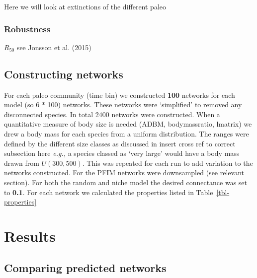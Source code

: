 \documentclass[
]{article}
\begin{document}
Here we will look at extinctions of the different paleo

\subsubsection{Robustness}\label{robustness}

\(R_{50}\) see Jonsson et al. (2015)

\subsection{Constructing networks}\label{constructing-networks}

For each paleo community (time bin) we constructed \textbf{100} networks
for each model (so 6 * 100) networks. These networks were `simplified'
to removed any disconnected species. In total 2400 networks were
constructed. When a quantitative measure of body size is needed (ADBM,
bodymassratio, lmatrix) we drew a body mass for each species from a
uniform distribution. The ranges were defined by the different size
classes as discussed in insert cross ref to correct subsection here
\emph{e.g.,} a species classed as `very large' would have a body mass
drawn from \(U(300, 500)\). This was repeated for each run to add
variation to the networks constructed. For the PFIM networks were
downsampled (see relevant section). For both the random and niche model
the desired connectance was set to \textbf{0.1}. For each network we
calculated the properties listed in Table~\ref{tbl-properties}

\section{Results}\label{results}

\subsection{Comparing predicted
networks}\label{comparing-predicted-networks}
\end{document}
